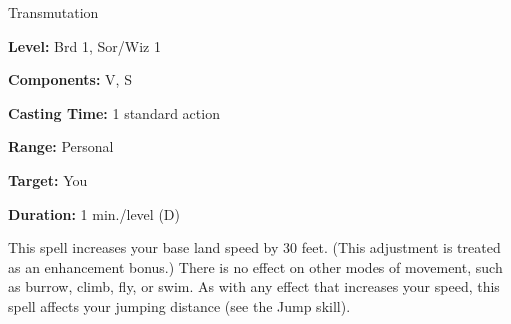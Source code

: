 
Transmutation

\textbf{Level:} Brd 1, Sor/Wiz 1

\textbf{Components:} V, S

\textbf{Casting Time:} 1 standard action

\textbf{Range:} Personal

\textbf{Target:} You

\textbf{Duration:} 1 min./level (D)

This spell increases your base land speed by 30 feet. (This adjustment is treated 
as an enhancement bonus.) There is no effect on other modes of movement, such as 
burrow, climb, fly, or swim. As with any effect that increases your speed, this 
spell affects your jumping distance (see the Jump skill).

